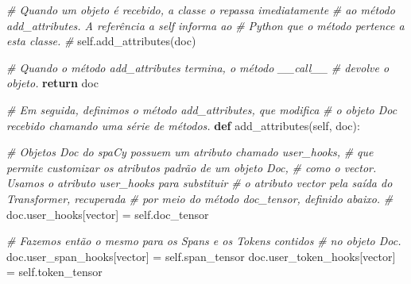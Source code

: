 \documentclass[
  brazilian,
]{article}
\newenvironment{Shaded}{}{}
\newcommand{\CommentTok}[1]{\textcolor[rgb]{0.38,0.63,0.69}{\textit{#1}}}
\newcommand{\ControlFlowTok}[1]{\textcolor[rgb]{0.00,0.44,0.13}{\textbf{#1}}}
\newcommand{\KeywordTok}[1]{\textcolor[rgb]{0.00,0.44,0.13}{\textbf{#1}}}
\newcommand{\NormalTok}[1]{#1}
\newcommand{\OperatorTok}[1]{\textcolor[rgb]{0.40,0.40,0.40}{#1}}
\newcommand{\StringTok}[1]{\textcolor[rgb]{0.25,0.44,0.63}{#1}}
\newcommand{\VariableTok}[1]{\textcolor[rgb]{0.10,0.09,0.49}{#1}}
\begin{document}
\begin{Shaded}
\begin{Highlighting}[]
        \CommentTok{\# Quando um objeto é recebido, a classe o repassa imediatamente}
        \CommentTok{\# ao método \textquotesingle{}add\_attributes\textquotesingle{}. A referência a self informa ao}
        \CommentTok{\# Python que o método pertence a esta classe.}
        \CommentTok{\#}
        \VariableTok{self}\NormalTok{.add\_attributes(doc)}
        
        \CommentTok{\# Quando o método \textquotesingle{}add\_attributes\textquotesingle{} termina, o método \_\_call\_\_}
        \CommentTok{\# devolve o objeto.}
        \ControlFlowTok{return}\NormalTok{ doc}
    
    \CommentTok{\# Em seguida, definimos o método \textquotesingle{}add\_attributes\textquotesingle{}, que modifica}
    \CommentTok{\# o objeto Doc recebido chamando uma série de métodos.}
    \KeywordTok{def}\NormalTok{ add\_attributes(}\VariableTok{self}\NormalTok{, doc):}
        
        \CommentTok{\# Objetos Doc do spaCy possuem um atributo chamado \textquotesingle{}user\_hooks\textquotesingle{},}
        \CommentTok{\# que permite customizar os atributos padrão de um objeto Doc,}
        \CommentTok{\# como o \textquotesingle{}vector\textquotesingle{}. Usamos o atributo \textquotesingle{}user\_hooks\textquotesingle{} para substituir}
        \CommentTok{\# o atributo \textquotesingle{}vector\textquotesingle{} pela saída do Transformer, recuperada}
        \CommentTok{\# por meio do método \textquotesingle{}doc\_tensor\textquotesingle{}, definido abaixo.}
        \CommentTok{\#}
\NormalTok{        doc.user\_hooks[}\StringTok{\textquotesingle{}vector\textquotesingle{}}\NormalTok{] }\OperatorTok{=} \VariableTok{self}\NormalTok{.doc\_tensor}
        
        \CommentTok{\# Fazemos então o mesmo para os Spans e os Tokens contidos}
        \CommentTok{\# no objeto Doc.}
\NormalTok{        doc.user\_span\_hooks[}\StringTok{\textquotesingle{}vector\textquotesingle{}}\NormalTok{] }\OperatorTok{=} \VariableTok{self}\NormalTok{.span\_tensor}
\NormalTok{        doc.user\_token\_hooks[}\StringTok{\textquotesingle{}vector\textquotesingle{}}\NormalTok{] }\OperatorTok{=} \VariableTok{self}\NormalTok{.token\_tensor}
        

\end{Highlighting}
\end{Shaded}
\end{document}
